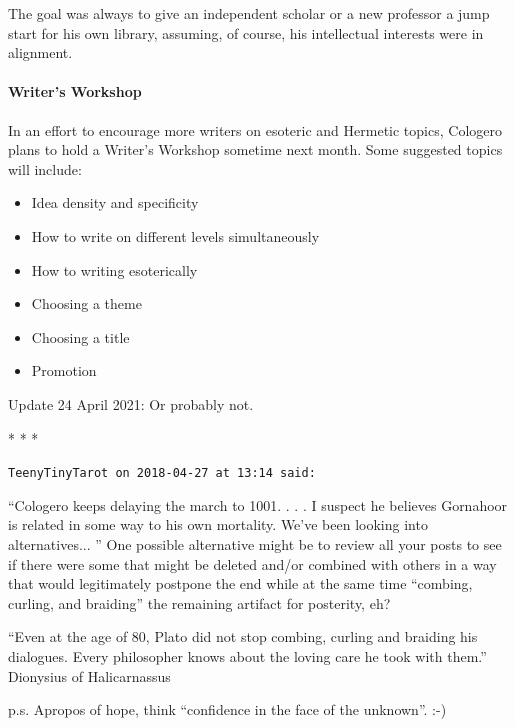 The goal was always to give an independent scholar or a new professor a jump start for his own library, assuming, of course, his intellectual interests were in alignment.

\paragraph{Writer's Workshop}


In an effort to encourage more writers on esoteric and Hermetic topics, Cologero plans to hold a Writer's Workshop sometime next month. Some suggested topics will include:

\begin{itemize}


\item Idea density and specificity

\item How to write on different levels simultaneously

\item How to writing esoterically

\item Choosing a theme

\item Choosing a title

\item Promotion
\end{itemize}


Update 24 April 2021: Or probably not.



\begin{center}* * *\end{center}

\begin{footnotesize}
\begin{sffamily}
\texttt{TeenyTinyTarot on 2018-04-27 at 13:14 said:} 

``Cologero keeps delaying the march to 1001. . . . I suspect he believes Gornahoor is related in some way to his own mortality. We've been looking into alternatives... '' One possible alternative might be to review all your posts to see if there were some that might be deleted and/or combined with others in a way that would legitimately postpone the end while at the same time ``combing, curling, and braiding'' the remaining artifact for posterity, eh?

``Even at the age of 80, Plato did not stop combing, curling and braiding his dialogues. Every philosopher knows about the loving care he took with them.''  Dionysius of Halicarnassus

p.s. Apropos of hope, think ``confidence in the face of the unknown''. :-)

\end{sffamily}
\end{footnotesize}

